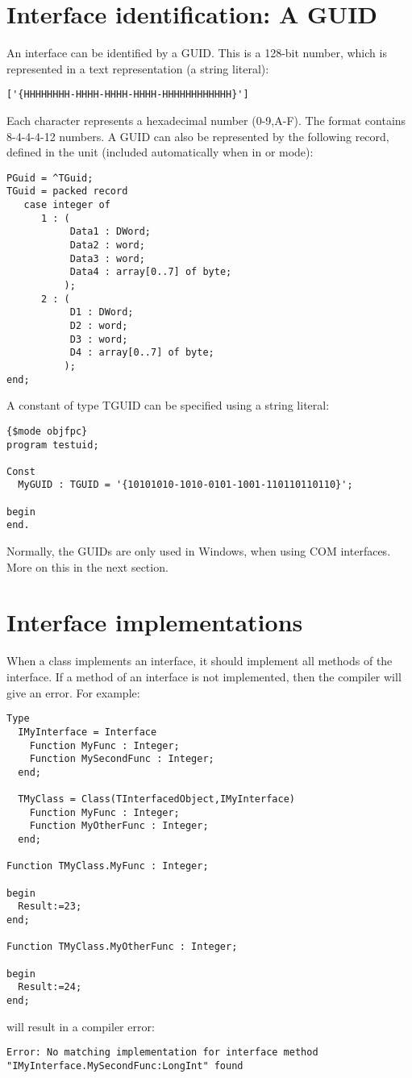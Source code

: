\section{Interface identification: A GUID}
An interface can be identified by a GUID. This is a 128-bit number, which is
represented in a text representation (a string literal):
\begin{verbatim}
['{HHHHHHHH-HHHH-HHHH-HHHH-HHHHHHHHHHHH}']
\end{verbatim}
Each  character represents a hexadecimal number (0-9,A-F). The format
contains 8-4-4-4-12 numbers. A GUID can also be represented by the following
record, defined in the  unit (included automatically when in
 or  mode):
\begin{verbatim}
PGuid = ^TGuid;
TGuid = packed record
   case integer of
      1 : (
           Data1 : DWord;
           Data2 : word;
           Data3 : word;
           Data4 : array[0..7] of byte;
          );
      2 : (
           D1 : DWord;
           D2 : word;
           D3 : word;
           D4 : array[0..7] of byte;
          );
end;
\end{verbatim}
A constant of type TGUID can be specified using a string literal:
\begin{verbatim}
{$mode objfpc}
program testuid;

Const
  MyGUID : TGUID = '{10101010-1010-0101-1001-110110110110}';

begin
end.
\end{verbatim}
Normally, the GUIDs are only used in Windows, when using COM interfaces.
More on this in the next section.

\section{Interface implementations}
When a class implements an interface, it should implement all methods of the
interface. If a method of an interface is not implemented, then the compiler
will give an error. For example:
\begin{verbatim}
Type
  IMyInterface = Interface
    Function MyFunc : Integer;
    Function MySecondFunc : Integer;
  end;

  TMyClass = Class(TInterfacedObject,IMyInterface)
    Function MyFunc : Integer;
    Function MyOtherFunc : Integer;
  end;

Function TMyClass.MyFunc : Integer;

begin
  Result:=23;
end;

Function TMyClass.MyOtherFunc : Integer;

begin
  Result:=24;
end;
\end{verbatim}
will result in a compiler error:
\begin{verbatim}
Error: No matching implementation for interface method
"IMyInterface.MySecondFunc:LongInt" found
\end{verbatim}

